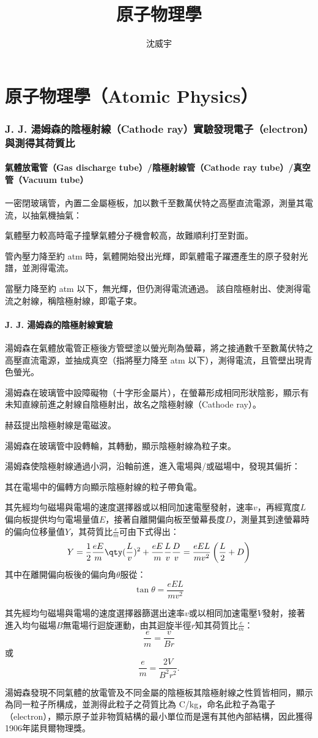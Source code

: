 \documentclass[a4paper,12pt]{report}
\begin{document}
\title{原子物理學}
\author{沈威宇}
\date{\temtoday}
\titletocdoc
\chapter{原子物理學（Atomic Physics）}
\subsection{J. J. 湯姆森的陰極射線（Cathode ray）實驗發現電子（electron）與測得其荷質比}
\subsubsection{氣體放電管（Gas discharge tube）/陰極射線管（Cathode ray tube）/真空管（Vacuum tube）}
一密閉玻璃管，內置二金屬極板，加以數千至數萬伏特之高壓直流電源，測量其電流，以抽氣機抽氣：
\bit
\item 氣體壓力較高時電子撞擊氣體分子機會較高，故難順利打至對面。
\item 管內壓力降至約  atm 時，氣體開始發出光輝，即氣體電子躍遷產生的原子發射光譜，並測得電流。
\item 當壓力降至約  atm 以下，無光輝，但仍測得電流通過。
\eit
該自陰極射出、使測得電流之射線，稱陰極射線，即電子束。
\subsubsection{J. J. 湯姆森的陰極射線實驗}
\bit
\item 湯姆森在氣體放電管正極後方管壁塗以螢光劑為螢幕，將之接通數千至數萬伏特之高壓直流電源，並抽成真空（指將壓力降至 atm 以下），測得電流，且管壁出現青色螢光。
\item 湯姆森在玻璃管中設障礙物（十字形金屬片），在螢幕形成相同形狀陰影，顯示有未知直線前進之射線自陰極射出，故名之陰極射線（Cathode ray）。
\item 赫茲提出陰極射線是電磁波。
\item 湯姆森在玻璃管中設轉輪，其轉動，顯示陰極射線為粒子束。
\item 湯姆森使陰極射線通過小洞，沿軸前進，進入電場與/或磁場中，發現其偏折：
\bit
\item 其在電場中的偏轉方向顯示陰極射線的粒子帶負電。
\item 其先經均勻磁場與電場的速度選擇器或以相同加速電壓發射，速率$v$，再經寬度$L$偏向板提供均勻電場量值$E$，接著自離開偏向板至螢幕長度$D$，測量其到達螢幕時的偏向位移量值$Y$，其荷質比$\frac{e}{m}$可由下式得出：
\[Y=\frac{1}{2}\frac{eE}{m}\qty(\frac{L}{v})^2+\frac{eE}{m}\frac{L}{v}\frac{D}{v}=\frac{eEL}{mv^2}\left(\frac{L}{2}+D\right)\]
其中在離開偏向板後的偏向角$\theta$服從：
\[\tan\theta=\frac{eEL}{mv^2}\]
\item 其先經均勻磁場與電場的速度選擇器篩選出速率$v$或以相同加速電壓$V$發射，接著進入均勻磁場$B$無電場行迴旋運動，由其迴旋半徑$r$知其荷質比$\frac{e}{m}$：
\[\frac{e}{m}=\frac{v}{Br}\]
或
\[\frac{e}{m}=\frac{2V}{B^2r^2}.\]
\eit
\item 湯姆森發現不同氣體的放電管及不同金屬的陰極板其陰極射線之性質皆相同，顯示為同一粒子所構成，並測得此粒子之荷質比為 C/kg，命名此粒子為電子（electron），顯示原子並非物質結構的最小單位而是還有其他內部結構，因此獲得1906年諾貝爾物理獎。
\eit
\end{document}
